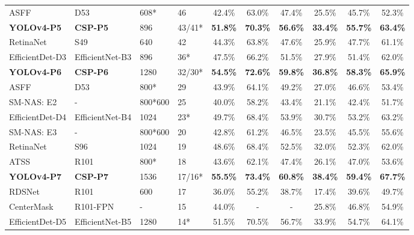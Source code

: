 \documentclass[10pt,twocolumn,letterpaper]{article}
\begin{document}
\begin{table*}[h]
\begin{threeparttable}[h]
\begin{tabular}{llllcccccc}
		ASFF \cite{liu2019learning} & D53 \cite{redmon2018yolov3} & 608* & 46 & 42.4\% & 63.0\% & 47.4\% & 25.5\% & 45.7\% & 52.3\% \\
		\textbf{YOLOv4-P5} & \textbf{CSP-P5} & 896 & 43/41* & \textbf{51.8\%} & \textbf{70.3\%} & \textbf{56.6\%} & \textbf{33.4\%} & \textbf{55.7\%} & \textbf{63.4\%} \\
		RetinaNet \cite{lin2017focal} & S49 \cite{du2019spinenet} & 640 & 42 & 44.3\% & 63.8\% & 47.6\% & 25.9\% & 47.7\% & 61.1\% \\
		EfficientDet-D3 \cite{tan2019efficientdet} & EfficientNet-B3 \cite{tan2019efficientnet} & 896 & 36* & 47.5\% & 66.2\% & 51.5\% & 27.9\% & 51.4\% & 62.0\% \\
		\textbf{YOLOv4-P6} & \textbf{CSP-P6} & 1280 & 32/30* & \textbf{54.5\%} & \textbf{72.6\%} & \textbf{59.8\%} & \textbf{36.8\%} & \textbf{58.3\%} & \textbf{65.9\%} \\
		\midrule
		ASFF\cite{liu2019learning} & D53 \cite{redmon2018yolov3} & 800* & 29 & 43.9\% & 64.1\% & 49.2\% & 27.0\% & 46.6\% & 53.4\% \\
		SM-NAS: E2 \cite{yao2019sm} & - & 800*600 & 25 & 40.0\% & 58.2\% & 43.4\% & 21.1\% & 42.4\% & 51.7\% \\
		EfficientDet-D4 \cite{tan2019efficientdet} & EfficientNet-B4 \cite{tan2019efficientnet} & 1024 & 23* & 49.7\% & 68.4\% & 53.9\% & 30.7\% & 53.2\% & 63.2\% \\
		SM-NAS: E3 \cite{yao2019sm} & - & 800*600 & 20 & 42.8\% & 61.2\% & 46.5\% & 23.5\% & 45.5\% & 55.6\% \\
		RetinaNet \cite{lin2017focal} & S96 \cite{du2019spinenet} & 1024 & 19 & 48.6\% & 68.4\% & 52.5\% & 32.0\% & 52.3\% & 62.0\% \\
		ATSS \cite{zhang2019bridging} & R101 \cite{he2016deep} & 800* & 18 & 43.6\% & 62.1\% & 47.4\% & 26.1\% & 47.0\% & 53.6\% \\
		\textbf{YOLOv4-P7} & \textbf{CSP-P7} & 1536 & 17/16* & \textbf{55.5\%} & \textbf{73.4\%} & \textbf{60.8\%} & \textbf{38.4\%} & \textbf{59.4\%} & \textbf{67.7\%} \\
		RDSNet \cite{wang2019rdsnet} & R101 \cite{he2016deep} & 600 & 17 & 36.0\% & 55.2\% & 38.7\% & 17.4\% & 39.6\% & 49.7\% \\
		CenterMask \cite{lee2019centermask} & R101-FPN \cite{lin2017feature} & - & 15 & 44.0\% & - & - & 25.8\% & 46.8\% & 54.9\% \\
		\midrule
		EfficientDet-D5 \cite{tan2019efficientdet} & EfficientNet-B5 \cite{tan2019efficientnet} & 1280 & 14* & 51.5\% & 70.5\% & 56.7\% & 33.9\% & 54.7\% & 64.1\% \\

\end{tabular}
\end{threeparttable}
\end{table*}
\end{document}
